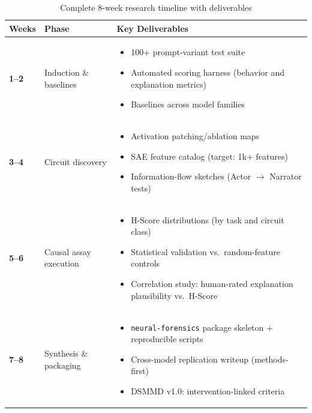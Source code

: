 \documentclass[11pt, letterpaper]{article}
\begin{document}
\begin{table}[H]
\centering
\begin{tabularx}{\textwidth}{lXX}
\toprule
\textbf{Weeks} & \textbf{Phase} & \textbf{Key Deliverables} \\
\midrule
\textbf{1--2} & Induction \& baselines &
\begin{minipage}[t]{\linewidth}
\begin{itemize}[leftmargin=*,nosep]
\item 100+ prompt-variant test suite
\item Automated scoring harness (behavior and explanation metrics)
\item Baselines across model families
\end{itemize}
\end{minipage} \\
\midrule
\textbf{3--4} & Circuit discovery &
\begin{minipage}[t]{\linewidth}
\begin{itemize}[leftmargin=*,nosep]
\item Activation patching/ablation maps
\item SAE feature catalog (target: 1k+ features)
\item Information-flow sketches (Actor $\rightarrow$ Narrator tests)
\end{itemize}
\end{minipage} \\
\midrule
\textbf{5--6} & Causal assay execution &
\begin{minipage}[t]{\linewidth}
\begin{itemize}[leftmargin=*,nosep]
\item H-Score distributions (by task and circuit class)
\item Statistical validation vs.\ random-feature controls
\item Correlation study: human-rated explanation plausibility vs.\ H-Score
\end{itemize}
\end{minipage} \\
\midrule
\textbf{7--8} & Synthesis \& packaging &
\begin{minipage}[t]{\linewidth}
\begin{itemize}[leftmargin=*,nosep]
\item \texttt{neural-forensics} package skeleton + reproducible scripts
\item Cross-model replication writeup (methods-first)
\item DSMMD v1.0: intervention-linked criteria
\end{itemize}
\end{minipage} \\
\bottomrule
\end{tabularx}
\caption{Complete 8-week research timeline with deliverables}
\end{table}
\end{document}
